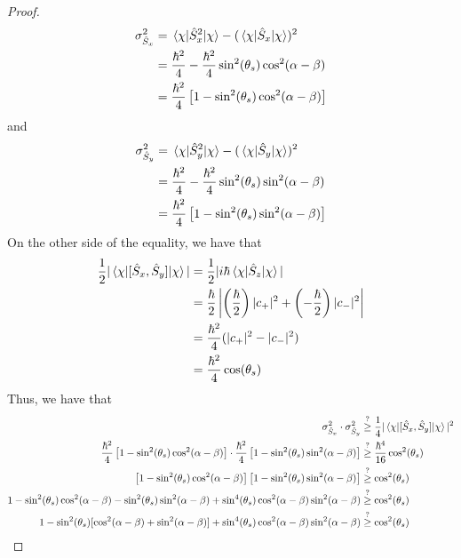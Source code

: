 \documentclass[../psets.tex]{subfiles}
\begin{document}
\begin{enumerate}
\begin{enumerate}
\begin{proof}
            \begin{align*}
                \sigma_{\hat{S}_x}^2 &= \ev{\hat{S}_x^2}{\chi}-(\ev{\hat{S}_x}{\chi})^2\\
                &= \frac{\hbar^2}{4}-\frac{\hbar^2}{4}\sin^2(\theta_s)\cos^2(\alpha-\beta)\\
                &= \frac{\hbar^2}{4}\left[ 1-\sin^2(\theta_s)\cos^2(\alpha-\beta) \right]
            \end{align*}
            and
            \begin{align*}
                \sigma_{\hat{S}_y}^2 &= \ev{\hat{S}_y^2}{\chi}-(\ev{\hat{S}_y}{\chi})^2\\
                &= \frac{\hbar^2}{4}-\frac{\hbar^2}{4}\sin^2(\theta_s)\sin^2(\alpha-\beta)\\
                &= \frac{\hbar^2}{4}\left[ 1-\sin^2(\theta_s)\sin^2(\alpha-\beta) \right]
            \end{align*}
            On the other side of the equality, we have that
            \begin{align*}
                \frac{1}{2}|\ev{[\hat{S}_x,\hat{S}_y]}{\chi}| &= \frac{1}{2}|i\hbar\ev{\hat{S}_z}{\chi}|\\
                &= \frac{\hbar}{2}\left| \left( \frac{\hbar}{2} \right)|c_+|^2+\left( -\frac{\hbar}{2} \right)|c_-|^2 \right|\\
                &= \frac{\hbar^2}{4}(|c_+|^2-|c_-|^2)\\
                &= \frac{\hbar^2}{4}\cos(\theta_s)
            \end{align*}
            Thus, we have that
            \begin{align*}
                \sigma_{\hat{S}_x}^2\cdot\sigma_{\hat{S}_y}^2 &\stackrel{?}{\geq} \frac{1}{4}|\ev{[\hat{S}_x,\hat{S}_y]}{\chi}|^2\\
                \frac{\hbar^2}{4}\left[ 1-\sin^2(\theta_s)\cos^2(\alpha-\beta) \right]\cdot\frac{\hbar^2}{4}\left[ 1-\sin^2(\theta_s)\sin^2(\alpha-\beta) \right] &\stackrel{?}{\geq} \frac{\hbar^4}{16}\cos^2(\theta_s)\\
                \left[ 1-\sin^2(\theta_s)\cos^2(\alpha-\beta) \right]\left[ 1-\sin^2(\theta_s)\sin^2(\alpha-\beta) \right] &\stackrel{?}{\geq} \cos^2(\theta_s)\\
                1-\sin^2(\theta_s)\cos^2(\alpha-\beta)-\sin^2(\theta_s)\sin^2(\alpha-\beta)+\sin^4(\theta_s)\cos^2(\alpha-\beta)\sin^2(\alpha-\beta) &\stackrel{?}{\geq} \cos^2(\theta_s)\\
                1-\sin^2(\theta_s)[\cos^2(\alpha-\beta)+\sin^2(\alpha-\beta)]+\sin^4(\theta_s)\cos^2(\alpha-\beta)\sin^2(\alpha-\beta) &\stackrel{?}{\geq} \cos^2(\theta_s)\\

\end{align*}
\end{proof}
\end{enumerate}
\end{enumerate}
\end{document}
